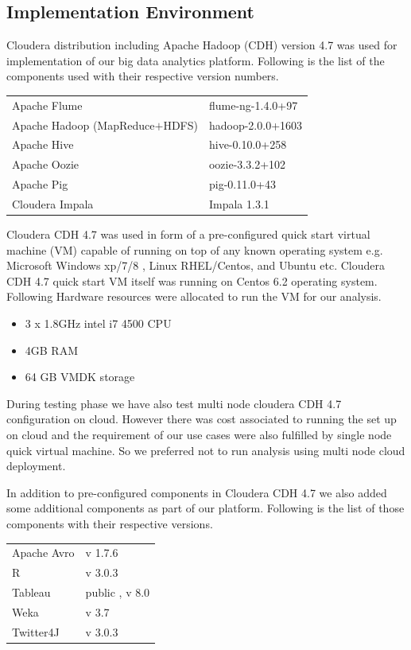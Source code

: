 \subsection{Implementation Environment}
Cloudera distribution including Apache Hadoop (CDH) version 4.7 was used for implementation of our big data analytics platform. Following is the list of the components used with their respective version numbers.  
\begin{longtable}{@{}p{}p{}@{}}
Apache Flume & flume-ng-1.4.0+97 \\
Apache Hadoop (MapReduce\(+\)HDFS) & hadoop-2.0.0+1603 \\ 
Apache Hive & hive-0.10.0+258 \\ 
Apache Oozie  & oozie-3.3.2+102 \\
Apache Pig & pig-0.11.0+43 \\ 
Cloudera Impala & Impala 1.3.1 
\end{longtable}
Cloudera CDH 4.7 was used in form of a pre-configured quick start virtual machine (VM) capable of running on top of any known operating system e.g. Microsoft Windows xp/7/8 , Linux RHEL/Centos, and Ubuntu etc. Cloudera CDH 4.7 quick start VM itself was running on Centos 6.2 operating system. Following Hardware resources were allocated to run the VM for our analysis.
\begin{itemize}
\item 3 x 1.8GHz intel i7 4500 CPU
\item 4GB RAM 
\item 64 GB VMDK storage
\end{itemize}
During testing phase we have also test multi node cloudera CDH 4.7 configuration on cloud. However there was cost associated to running the set up on cloud and the requirement of our use cases were also fulfilled by single node quick virtual machine. So we preferred not to run analysis using multi node cloud deployment.

In addition to pre-configured components in Cloudera CDH 4.7 we also added some additional components as part of our platform. Following is the list of those components with their respective versions.
\begin{longtable}{@{}p{}p{}@{}}
Apache Avro & v 1.7.6 \\
R & v 3.0.3 \\ 
Tableau & public , v 8.0 \\ 
Weka  & v 3.7 \\
Twitter4J & v 3.0.3 
\end{longtable}

